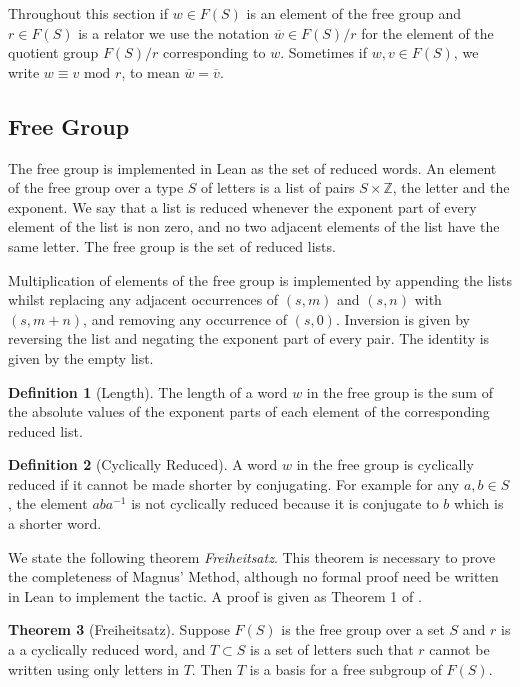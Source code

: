 \documentclass[12pt]{article} %
\theoremstyle{definition}
\newtheorem{thm}{Theorem}[subsubsection]
\theoremstyle{definition}
\theoremstyle{definition}
\theoremstyle{definition}
\newtheorem{defn}[thm]{Definition}
\begin{document}
Throughout this section if $w \in F(S)$ is an element of the free group and $r \in F(S)$
is a relator we use the notation $\overline{w} \in F(S) / r$ for the element of the quotient
group $F(S) / r$ corresponding to $w$. Sometimes if $w, v \in F(S)$,
we write $w \equiv v \text{ mod } r$, to mean $\overline{w} = \overline{v}$.

\subsection{Free Group}

The free group is implemented in Lean as the set of reduced words. An element of
the free group over a type $S$ of letters is a list of pairs $S \times \mathbb{Z}$,
the letter and the exponent. We say that a list is reduced whenever
the exponent part of every element of the list is non zero, and
no two adjacent elements of the list have the same letter. The free group is the set of
reduced lists.

Multiplication of elements of the free group is implemented by appending the lists
whilst replacing any adjacent occurrences of $(s, m)$ and $(s, n)$ with $(s, m + n)$, and removing
any occurrence of $(s, 0)$. Inversion is given by reversing the list and negating
the exponent part of every pair. The identity is given by the empty list.

\begin{defn}[Length]\label{length}
  The length of a word $w$ in the free group is the sum of the absolute values of the exponent
  parts of each element of the corresponding reduced list.
\end{defn}

\begin{defn}[Cyclically Reduced]\label{cycred}
  A word $w$ in the free group is cyclically reduced if it cannot be made shorter
  by conjugating. For example for any $a, b \in S$,
  the element $aba^{-1}$ is not cyclically reduced
  because it is conjugate to $b$ which is a shorter word.
\end{defn}

We state the following theorem \textit{Freiheitsatz}. This theorem
is necessary to prove the completeness of Magnus' Method, although no formal
proof need be written in Lean to implement the tactic. A proof
is given as Theorem 1 of \cite{mccool_schupp_1973}.

\begin{thm}[Freiheitsatz]\label{freiheitsatz}
  Suppose $F(S)$ is the free group over a set $S$ and $r$ is a a cyclically reduced
  word, and $T \subset S$ is a set of letters such that $r$ cannot be written
  using only letters in $T$. Then $T$ is a basis for a free subgroup of $F(S)$.
\end{thm}
\end{document}
